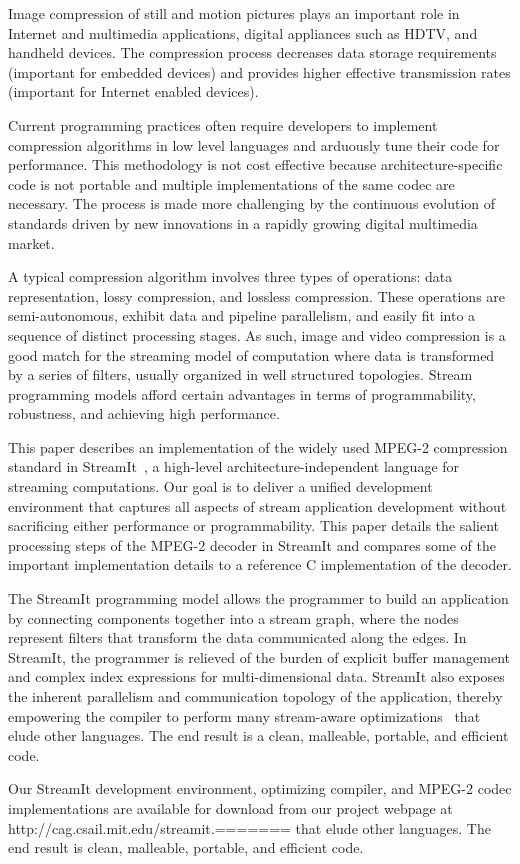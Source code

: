 \vspace{-12pt}
\vspace{-6pt}

Image compression of still and motion pictures plays an important role
in Internet and multimedia applications, digital appliances such as
HDTV, and handheld devices. The compression process decreases data storage
requirements (important for embedded devices) and provides higher
effective transmission rates (important for Internet enabled devices).

Current programming practices often require developers to implement
compression algorithms in low level languages and arduously
tune their code for performance. This methodology is not cost
effective because architecture-specific code is not portable and 
multiple implementations of the same codec are necessary. 
The process is made more challenging by the continuous evolution
of standards driven by new innovations in a rapidly growing 
digital multimedia market.

A typical compression algorithm involves three types of operations:
data representation, lossy compression, and lossless
compression. These operations are semi-autonomous, exhibit data and
pipeline parallelism, and easily fit into a sequence of distinct
processing stages. As such, image and video compression is a good
match for the streaming model of computation where data is transformed
by a series of filters, usually organized in well structured
topologies.  Stream programming models afford certain advantages in
terms of programmability, robustness, and achieving high performance.

This paper describes an implementation of the widely used MPEG-2
compression standard in StreamIt~\cite{streamitcc}, a high-level
architecture-independent language for streaming computations. Our goal
is to deliver a unified development environment that captures all
aspects of stream application development without sacrificing either
performance or programmability. This paper details the salient
processing steps of the MPEG-2 decoder in StreamIt and compares some
of the important implementation details to a reference C
implementation of the decoder.

The StreamIt programming model allows the programmer to build an
application by connecting components together into a stream graph,
where the nodes represent filters that transform the data communicated
along the edges. In StreamIt, the programmer is relieved of the burden
of explicit buffer management and complex index expressions for
multi-dimensional data.  StreamIt also exposes the inherent
parallelism and communication topology of the application, thereby
empowering the compiler to perform many stream-aware
optimizations~\cite{agrawal05cases,gordon02asplos,lamb03pldi,sermulins05lctes}
that elude other languages. The end result is a clean, malleable,
portable, and efficient code.

Our StreamIt development environment, optimizing compiler, and MPEG-2
codec implementations are available for download from our project
webpage at http://cag.csail.mit.edu/streamit.======= that elude other
languages. The end result is clean, malleable, portable, and efficient
code.
